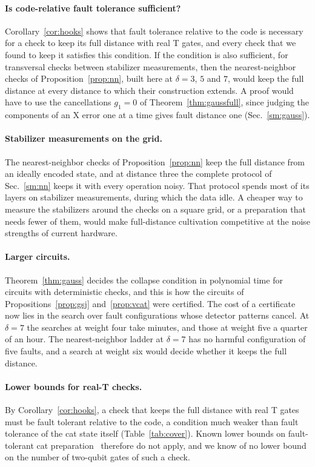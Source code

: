 \documentclass[aps,prl,reprint,twocolumn,amsmath,amssymb,floatfix,nofootinbib,superscriptaddress]{revtex4-2}
\theoremstyle{definition}
\theoremstyle{remark}
\begin{document}
\paragraph*{Is code-relative fault tolerance sufficient?}
Corollary~\ref{cor:hooks} shows that fault tolerance relative to the code is necessary for a check to keep its full distance with real T gates, and every check that we found to keep it satisfies this condition. If the condition is also sufficient, for transversal checks between stabilizer measurements, then the nearest-neighbor checks of Proposition~\ref{prop:nn}, built here at $\delta=3$, $5$ and $7$, would keep the full distance at every distance to which their construction extends. A proof would have to use the cancellations $g_1=0$ of Theorem~\ref{thm:gaussfull}, since judging the components of an X error one at a time gives fault distance one (Sec.~\ref{sm:gauss}).

\paragraph*{Stabilizer measurements on the grid.}
The nearest-neighbor checks of Proposition~\ref{prop:nn} keep the full distance from an ideally encoded state, and at distance three the complete protocol of Sec.~\ref{sm:nn} keeps it with every operation noisy. That protocol spends most of its layers on stabilizer measurements, during which the data idle. A cheaper way to measure the stabilizers around the checks on a square grid, or a preparation that needs fewer of them, would make full-distance cultivation competitive at the noise strengths of current hardware.

\paragraph*{Larger circuits.}
Theorem~\ref{thm:gauss} decides the collapse condition in polynomial time for circuits with deterministic checks, and this is how the circuits of Propositions~\ref{prop:gsj} and~\ref{prop:vcat} were certified. The cost of a certificate now lies in the search over fault configurations whose detector patterns cancel. At $\delta=7$ the searches at weight four take minutes, and those at weight five a quarter of an hour. The nearest-neighbor ladder at $\delta=7$ has no harmful configuration of five faults, and a search at weight six would decide whether it keeps the full distance.

\paragraph*{Lower bounds for real-T checks.}
By Corollary~\ref{cor:hooks}, a check that keeps the full distance with real T gates must be fault tolerant relative to the code, a condition much weaker than fault tolerance of the cat state itself (Table~\ref{tab:cover}). Known lower bounds on fault-tolerant cat preparation~\cite{spidercat} therefore do not apply, and we know of no lower bound on the number of two-qubit gates of such a check.
\end{document}
